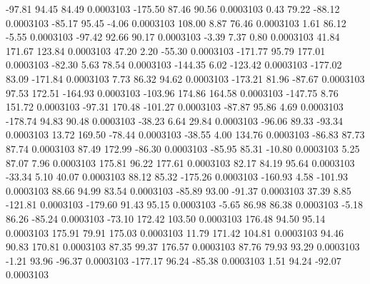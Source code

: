      -97.81       94.45       84.49     0.0003103
     -175.50       87.46       90.56     0.0003103
        0.43       79.22      -88.12     0.0003103
      -85.17       95.45       -4.06     0.0003103
      108.00        8.87       76.46     0.0003103
        1.61       86.12       -5.55     0.0003103
      -97.42       92.66       90.17     0.0003103
       -3.39        7.37        0.80     0.0003103
       41.84      171.67      123.84     0.0003103
       47.20        2.20      -55.30     0.0003103
     -171.77       95.79      177.01     0.0003103
      -82.30        5.63       78.54     0.0003103
     -144.35        6.02     -123.42     0.0003103
     -177.02       83.09     -171.84     0.0003103
        7.73       86.32       94.62     0.0003103
     -173.21       81.96      -87.67     0.0003103
       97.53      172.51     -164.93     0.0003103
     -103.96      174.86      164.58     0.0003103
     -147.75        8.76      151.72     0.0003103
      -97.31      170.48     -101.27     0.0003103
      -87.87       95.86        4.69     0.0003103
     -178.74       94.83       90.48     0.0003103
      -38.23        6.64       29.84     0.0003103
      -96.06       89.33      -93.34     0.0003103
       13.72      169.50      -78.44     0.0003103
      -38.55        4.00      134.76     0.0003103
      -86.83       87.73       87.74     0.0003103
       87.49      172.99      -86.30     0.0003103
      -85.95       85.31      -10.80     0.0003103
        5.25       87.07        7.96     0.0003103
      175.81       96.22      177.61     0.0003103
       82.17       84.19       95.64     0.0003103
      -33.34        5.10       40.07     0.0003103
       88.12       85.32     -175.26     0.0003103
     -160.93        4.58     -101.93     0.0003103
       88.66       94.99       83.54     0.0003103
      -85.89       93.00      -91.37     0.0003103
       37.39        8.85     -121.81     0.0003103
     -179.60       91.43       95.15     0.0003103
       -5.65       86.98       86.38     0.0003103
       -5.18       86.26      -85.24     0.0003103
      -73.10      172.42      103.50     0.0003103
      176.48       94.50       95.14     0.0003103
      175.91       79.91      175.03     0.0003103
       11.79      171.42      104.81     0.0003103
       94.46       90.83      170.81     0.0003103
       87.35       99.37      176.57     0.0003103
       87.76       79.93       93.29     0.0003103
       -1.21       93.96      -96.37     0.0003103
     -177.17       96.24      -85.38     0.0003103
        1.51       94.24      -92.07     0.0003103
